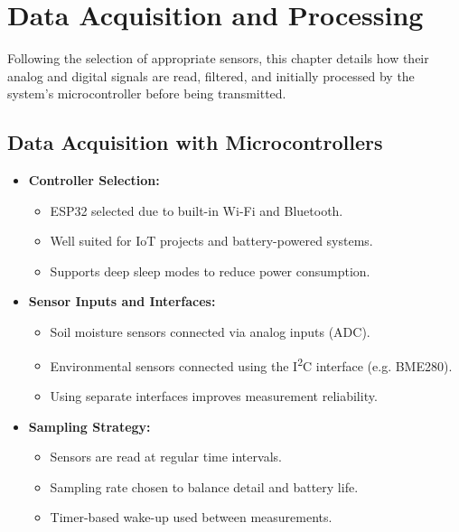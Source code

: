 \section{Data Acquisition and Processing}

Following the selection of appropriate sensors, this chapter details how their analog and digital signals are read, filtered, and initially processed by the system's microcontroller before being transmitted.

\subsection{Data Acquisition with Microcontrollers}
\begin{itemize}
    \item \textbf{Controller Selection:}
    \begin{itemize}
        \item ESP32 selected due to built-in Wi-Fi and Bluetooth.
        \item Well suited for IoT projects and battery-powered systems.
        \item Supports deep sleep modes to reduce power consumption.
    \end{itemize}

    \item \textbf{Sensor Inputs and Interfaces:}
    \begin{itemize}
        \item Soil moisture sensors connected via analog inputs (ADC).
        \item Environmental sensors connected using the I\textsuperscript{2}C interface (e.g. BME280).
        \item Using separate interfaces improves measurement reliability.
    \end{itemize}

    \item \textbf{Sampling Strategy:}
    \begin{itemize}
        \item Sensors are read at regular time intervals.
        \item Sampling rate chosen to balance detail and battery life.
        \item Timer-based wake-up used between measurements.
    \end{itemize}
\end{itemize}

